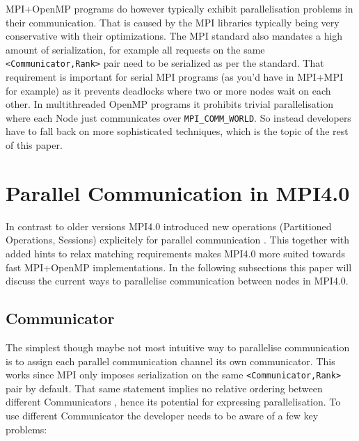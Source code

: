 \documentclass[sigconf]{acmart} %
\begin{document}
MPI+OpenMP programs do however typically exhibit parallelisation problems in their communication.
That is caused by the MPI libraries typically being very conservative with their optimizations.
The MPI standard also mandates a high amount of serialization, for example all requests on the same \verb|<Communicator,Rank>| pair need to be serialized as per the standard.
That requirement is important for serial MPI programs (as you'd have in MPI+MPI for example) as it prevents deadlocks where two or more nodes wait on each other.
In multithreaded OpenMP programs it prohibits trivial parallelisation where each Node just communicates over \verb|MPI_COMM_WORLD|.
So instead developers have to fall back on more sophisticated techniques, which is the topic of the rest of this paper.

\section{Parallel Communication in MPI4.0}


In contrast to older versions MPI4.0 introduced new operations (Partitioned Operations, Sessions) explicitely for parallel communication \cite{mpi40}.
This together with added hints to relax matching requirements makes MPI4.0 more suited towards fast MPI+OpenMP implementations.
In the following subsections this paper will discuss the current ways to parallelise communication between nodes in MPI4.0.

\subsection{Communicator}

The simplest though maybe not most intuitive way to parallelise communication is to assign each parallel communication channel its own communicator.
This works since MPI only imposes serialization on the same \verb|<Communicator,Rank>| pair by default.
That same statement implies no relative ordering between different Communicators \cite{zambreLessonsLearned2022}, hence its potential for expressing parallelisation.
To use different Communicator the developer needs to be aware of a few key problems:
\end{document}
